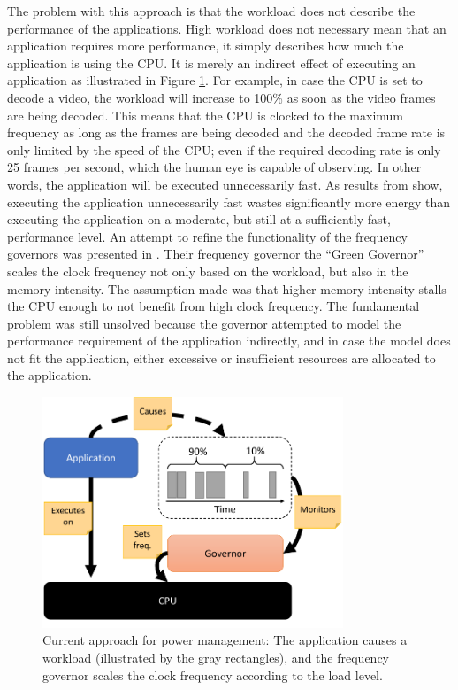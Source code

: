 \documentclass{article}
\begin{document}
The problem with this approach is that the workload does not describe the performance of the applications.
High workload does not necessary mean that an application requires more performance, it simply describes how much the application is using the CPU.
It is merely an indirect effect of executing an application as illustrated in Figure \ref{fig:workload}.
For example, in case the CPU is set to decode a video, the workload will increase to 100\% as soon as the video frames are being decoded.  
This means that the CPU is clocked to the maximum frequency as long as the frames are being decoded and the decoded frame rate is only limited by the speed of the CPU; 
even if the required decoding rate is only 25 frames per second, which the human eye is capable of observing.
In other words, the application will be executed unnecessarily fast. 
As results from \cite{HolmbackaHipeac, HolmbackaDasip} show, executing the application unnecessarily fast wastes significantly more energy than executing the application on a moderate, 
but still at a sufficiently fast, performance level. 
An attempt to refine the functionality of the frequency governors was presented in \cite{Spiliopoulos:11}.
Their frequency governor the ``Green Governor'' scales the clock frequency not only based on the workload, but also in the memory intensity.
The assumption made was that higher memory intensity stalls the CPU enough to not benefit from high clock frequency.
The fundamental problem was still unsolved because the governor attempted to model the performance requirement of the application indirectly,
and in case the model does not fit the application, either excessive or insufficient resources are allocated to the application.
\begin{figure}
  \begin{center}
    \includegraphics[width=9cm]{fig/WorkloadMonitor.png}
  \end{center}
  \caption{Current approach for power management: The application causes a workload (illustrated by the gray rectangles), and the frequency governor scales the clock frequency according to the load level.}
  \label{fig:workload}
  \vspace{-2cm}
\end{figure}
\end{document}
